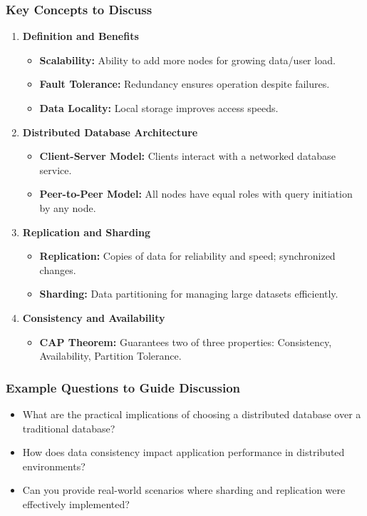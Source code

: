 \documentclass[aspectratio=169]{beamer}
\begin{document}
\begin{frame}[fragile]
  \frametitle{Key Concepts to Discuss}
  \begin{enumerate}
    \item \textbf{Definition and Benefits}
      \begin{itemize}
        \item \textbf{Scalability:} Ability to add more nodes for growing data/user load.
        \item \textbf{Fault Tolerance:} Redundancy ensures operation despite failures.
        \item \textbf{Data Locality:} Local storage improves access speeds.
      \end{itemize}
    
    \item \textbf{Distributed Database Architecture}
      \begin{itemize}
        \item \textbf{Client-Server Model:} Clients interact with a networked database service.
        \item \textbf{Peer-to-Peer Model:} All nodes have equal roles with query initiation by any node.
      \end{itemize}
    
    \item \textbf{Replication and Sharding}
      \begin{itemize}
        \item \textbf{Replication:} Copies of data for reliability and speed; synchronized changes.
        \item \textbf{Sharding:} Data partitioning for managing large datasets efficiently.
      \end{itemize}
    
    \item \textbf{Consistency and Availability}
      \begin{itemize}
        \item \textbf{CAP Theorem:} Guarantees two of three properties: Consistency, Availability, Partition Tolerance.
      \end{itemize}
  \end{enumerate}
\end{frame}

\begin{frame}[fragile]
  \frametitle{Example Questions to Guide Discussion}
  \begin{itemize}
    \item What are the practical implications of choosing a distributed database over a traditional database?
    \item How does data consistency impact application performance in distributed environments?
    \item Can you provide real-world scenarios where sharding and replication were effectively implemented?
  \end{itemize}
\end{frame}
\end{document}

